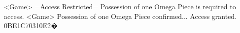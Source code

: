 <Game> =Access Restricted= Possession of one Omega Piece is required to access. 
<Game> Possession of one Omega Piece confirmed... Access granted. 
{0B}{E1}{C7}{03}{10}{E2}�
